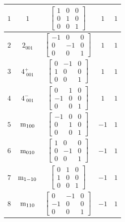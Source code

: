 \documentclass[fleqn,8pt]{jsarticle}
\begin{document}
\begin{longtable}{ccccc}
$ 1 $ & $ 1 $ & $ \begin{bmatrix} 1 & 0 & 0 \\ 0 & 1 & 0 \\ 0 & 0 & 1 \end{bmatrix} $ & $ 1 $ & $ 1 $ \\ \hline
$ 2 $ & $ 2{}_{001} $ & $ \begin{bmatrix} -1 & 0 & 0 \\ 0 & -1 & 0 \\ 0 & 0 & 1 \end{bmatrix} $ & $ 1 $ & $ 1 $ \\ \hline
$ 3 $ & $ 4^{+}_{\,\,001} $ & $ \begin{bmatrix} 0 & -1 & 0 \\ 1 & 0 & 0 \\ 0 & 0 & 1 \end{bmatrix} $ & $ 1 $ & $ 1 $ \\ \hline
$ 4 $ & $ 4^{-}_{\,\,001} $ & $ \begin{bmatrix} 0 & 1 & 0 \\ -1 & 0 & 0 \\ 0 & 0 & 1 \end{bmatrix} $ & $ 1 $ & $ 1 $ \\ \hline
$ 5 $ & $ {\rm m}_{100} $ & $ \begin{bmatrix} -1 & 0 & 0 \\ 0 & 1 & 0 \\ 0 & 0 & 1 \end{bmatrix} $ & $ -1 $ & $ 1 $ \\ \hline
$ 6 $ & $ {\rm m}_{010} $ & $ \begin{bmatrix} 1 & 0 & 0 \\ 0 & -1 & 0 \\ 0 & 0 & 1 \end{bmatrix} $ & $ -1 $ & $ 1 $ \\ \hline
$ 7 $ & $ {\rm m}_{1-10} $ & $ \begin{bmatrix} 0 & 1 & 0 \\ 1 & 0 & 0 \\ 0 & 0 & 1 \end{bmatrix} $ & $ -1 $ & $ 1 $ \\ \hline
$ 8 $ & $ {\rm m}_{110} $ & $ \begin{bmatrix} 0 & -1 & 0 \\ -1 & 0 & 0 \\ 0 & 0 & 1 \end{bmatrix} $ & $ -1 $ & $ 1 $ \\
\end{longtable}
\end{document}
